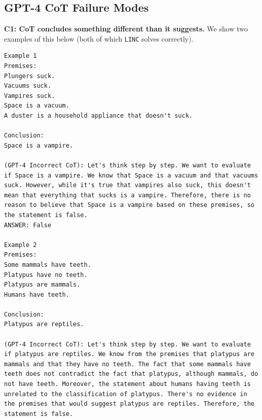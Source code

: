 \subsection{GPT-4 CoT Failure Modes}
\textbf{C1: CoT concludes something different than it suggests.} We show two examples of this below (both of which \texttt{LINC} solves correctly).
\begin{lstlisting}[breaklines=true]
Example 1
Premises:
Plungers suck.
Vacuums suck.
Vampires suck.
Space is a vacuum.
A duster is a household appliance that doesn't suck.

Conclusion:
Space is a vampire.

(GPT-4 Incorrect CoT): Let's think step by step. We want to evaluate if Space is a vampire. We know that Space is a vacuum and that vacuums suck. However, while it's true that vampires also suck, this doesn't mean that everything that sucks is a vampire. Therefore, there is no reason to believe that Space is a vampire based on these premises, so the statement is false.
ANSWER: False

Example 2
Premises:
Some mammals have teeth.
Platypus have no teeth.
Platypus are mammals.
Humans have teeth.

Conclusion:
Platypus are reptiles.

(GPT-4 Incorrect CoT): Let's think step by step. We want to evaluate if platypus are reptiles. We know from the premises that platypus are mammals and that they have no teeth. The fact that some mammals have teeth does not contradict the fact that platypus, although mammals, do not have teeth. Moreover, the statement about humans having teeth is unrelated to the classification of platypus. There's no evidence in the premises that would suggest platypus are reptiles. Therefore, the statement is false.
\end{lstlisting}

